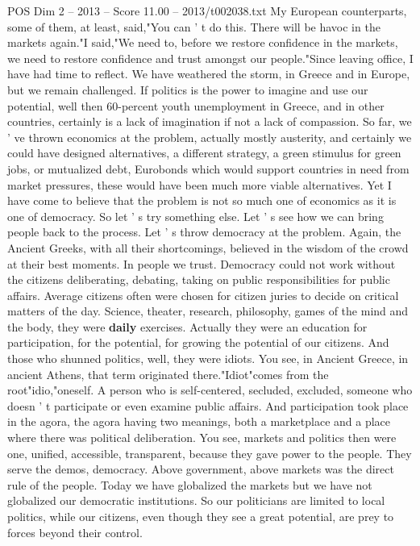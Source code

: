 \begin{textsample}{POS Dim 2 – 2013 – Score 11.00 – 2013/t002038.txt}
My European counterparts, some of them, at least, said,"You can ' t do this.
There will be havoc in the markets again."I said,"We need to, before we restore confidence in the markets, we need to restore confidence and trust amongst our people."Since leaving office, I have had time to reflect.
We have weathered the storm, in Greece and in Europe, but we remain challenged.
If politics is the power to imagine and use our potential, well then 60-percent youth unemployment in Greece, and in other countries, certainly is a lack of imagination if not a lack of compassion.
So far, we ' ve thrown economics at the problem, actually mostly austerity, and certainly we could have designed alternatives, a different strategy, a green stimulus for green jobs, or mutualized debt, Eurobonds which would support countries in need from market pressures, these would have been much more viable alternatives.
Yet I have come to believe that the problem is not so much one of economics as it is one of democracy.
So let ' s try something else.
Let ' s see how we can bring people back to the process.
Let ' s throw democracy at the problem.
Again, the Ancient Greeks, with all their shortcomings, believed in the wisdom of the crowd at their best moments.
In people we trust.
Democracy could not work without the citizens deliberating, debating, taking on public responsibilities for public affairs.
Average citizens often were chosen for citizen juries to decide on critical matters of the day.
Science, theater, research, philosophy, games of the mind and the body, they were \textbf{daily} exercises.
Actually they were an education for participation, for the potential, for growing the potential of our citizens.
And those who shunned politics, well, they were idiots.
You see, in Ancient Greece, in ancient Athens, that term originated there."Idiot"comes from the root"idio,"oneself.
A person who is self-centered, secluded, excluded, someone who doesn ' t participate or even examine public affairs.
And participation took place in the agora, the agora having two meanings, both a marketplace and a place where there was political deliberation.
You see, markets and politics then were one, unified, accessible, transparent, because they gave power to the people.
They serve the demos, democracy.
Above government, above markets was the direct rule of the people.
Today we have globalized the markets but we have not globalized our democratic institutions.
So our politicians are limited to local politics, while our citizens, even though they see a great potential, are prey to forces beyond their control.

\end{textsample}
